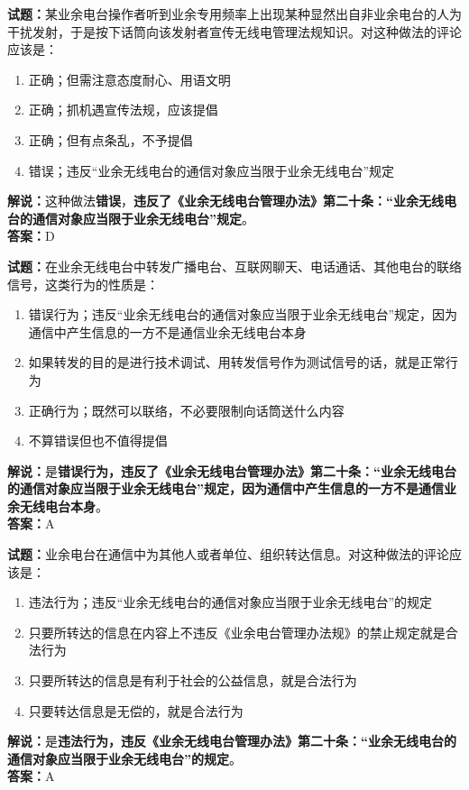 \documentclass{ctexbook}
\begin{document}
\bigskip


\noindent\textbf{试题：}某业余电台操作者听到业余专用频率上出现某种显然出自非业余电台的人为干扰发射，于是按下话筒向该发射者宣传无线电管理法规知识。对这种做法的评论应该是：
\begin{enumerate}[leftmargin=3em]
\item 正确；但需注意态度耐心、用语文明
\item 正确；抓机遇宣传法规，应该提倡
\item 正确；但有点条乱，不予提倡
\item 错误；违反“业余无线电台的通信对象应当限于业余无线电台”规定%
\end{enumerate}
\noindent\textbf{解说：}这种做法\textbf{错误}，\textbf{违反了《业余无线电台管理办法》第二十条：“业余无线电台的通信对象应当限于业余无线电台”规定}。\\\noindent\textbf{答案：}D



\bigskip


\noindent\textbf{试题：}在业余无线电台中转发广播电台、互联网聊天、电话通话、其他电台的联络信号，这类行为的性质是：
\begin{enumerate}[leftmargin=3em]
\item 错误行为；违反“业余无线电台的通信对象应当限于业余无线电台”规定，因为通信中产生信息的一方不是通信业余无线电台本身
\item 如果转发的目的是进行技术调试、用转发信号作为测试信号的话，就是正常行为
\item 正确行为；既然可以联络，不必要限制向话筒送什么内容
\item 不算错误但也不值得提倡
\end{enumerate}
\noindent\textbf{解说：}是\textbf{错误行为，违反了《业余无线电台管理办法》第二十条：“业余无线电台的通信对象应当限于业余无线电台”规定，因为通信中产生信息的一方不是通信业余无线电台本身}。\\\noindent\textbf{答案：}A



\bigskip


\noindent\textbf{试题：}业余电台在通信中为其他人或者单位、组织转达信息。对这种做法的评论应该是：
\begin{enumerate}[leftmargin=3em]
\item 违法行为；违反“业余无线电台的通信对象应当限于业余无线电台”的规定
\item 只要所转达的信息在内容上不违反《业余电台管理办法规》的禁止规定就是合法行为
\item 只要所转达的信息是有利于社会的公益信息，就是合法行为
\item 只要转达信息是无偿的，就是合法行为
\end{enumerate}
\noindent\textbf{解说：}是\textbf{违法行为，违反《业余无线电台管理办法》第二十条：“业余无线电台的通信对象应当限于业余无线电台”的规定}。\\\noindent\textbf{答案：}A
\end{document}
